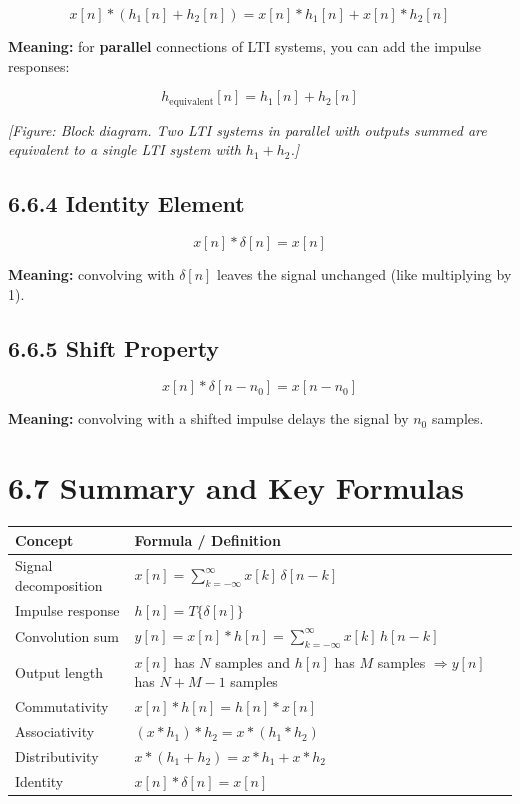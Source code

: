 \documentclass[11pt]{article}
\begin{document}
\[x[n]*(h_1[n] + h_2[n]) = x[n]*h_1[n] + x[n]*h_2[n]\]

\textbf{Meaning:} for \textbf{parallel} connections of LTI systems, you can add the impulse responses:

\[h_{\text{equivalent}}[n] = h_1[n] + h_2[n]\]

\textit{[Figure: Block diagram. Two LTI systems in parallel with outputs summed are equivalent to a single LTI system with $h_1 + h_2$.]}

\subsection*{6.6.4 Identity Element}

\[x[n]*\delta[n] = x[n]\]

\textbf{Meaning:} convolving with $\delta[n]$ leaves the signal unchanged (like multiplying by 1).

\subsection*{6.6.5 Shift Property}

\[x[n]*\delta[n - n_0] = x[n - n_0]\]

\textbf{Meaning:} convolving with a shifted impulse delays the signal by $n_0$ samples.

\section*{6.7 Summary and Key Formulas}

\begin{center}
\begin{tabular}{|l|l|}
\hline
\textbf{Concept} & \textbf{Formula / Definition} \\
\hline
Signal decomposition & $x[n] = \sum_{k=-\infty}^{\infty} x[k]\,\delta[n-k]$ \\
\hline
Impulse response & $h[n] = T\{\delta[n]\}$ \\
\hline
Convolution sum & $y[n] = x[n]*h[n] = \sum_{k=-\infty}^{\infty} x[k]\,h[n-k]$ \\
\hline
Output length & $x[n]$ has $N$ samples and $h[n]$ has $M$ samples $\Rightarrow y[n]$ has $N+M-1$ samples \\
\hline
Commutativity & $x[n]*h[n] = h[n]*x[n]$ \\
\hline
Associativity & $(x*h_1)*h_2 = x*(h_1*h_2)$ \\
\hline
Distributivity & $x*(h_1 + h_2) = x*h_1 + x*h_2$ \\
\hline
Identity & $x[n]*\delta[n] = x[n]$ \\
\hline
\end{tabular}
\end{center}
\end{document}
